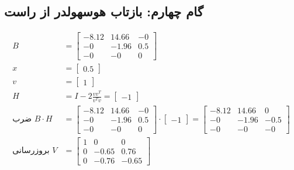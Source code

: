 \subsection*{گام چهارم: بازتاب هوسهولدر از راست }
\begin{align*}
B &= \begin{bmatrix}
-8.12 & 14.66 & -0 \\
 -0 & -1.96 & 0.5 \\
 -0 & -0 & 0
\end{bmatrix} \\
x &= \begin{bmatrix}
0.5
\end{bmatrix} \\
v &= \begin{bmatrix}
1
\end{bmatrix} \\
H &= I - 2 \frac{vv^T}{v^T v} = \begin{bmatrix}
-1
\end{bmatrix} \\
\text{ضرب } B \cdot H &= \begin{bmatrix}
-8.12 & 14.66 & -0 \\
 -0 & -1.96 & 0.5 \\
 -0 & -0 & 0
\end{bmatrix} \cdot \begin{bmatrix}
-1
\end{bmatrix} = \begin{bmatrix}
-8.12 & 14.66 & 0 \\
 -0 & -1.96 & -0.5 \\
 -0 & -0 & -0
\end{bmatrix} \\
\text{بروزرسانی } V &= \begin{bmatrix}
 1 & 0 & 0 \\
 0 & -0.65 & 0.76 \\
 0 & -0.76 & -0.65
\end{bmatrix}
\end{align*}

